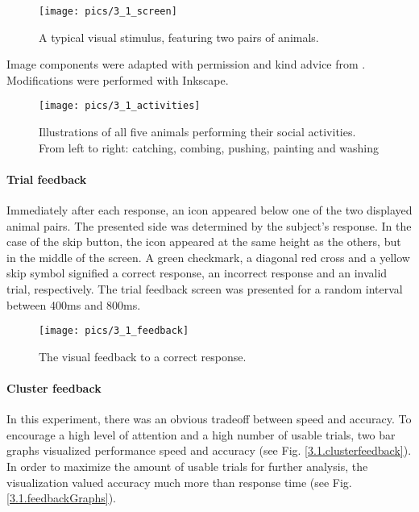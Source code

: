 \begin{figure}[h]
\begin{center}
\vspace{7mm}
\texttt{[image: pics/3\_1\_screen]}
\caption{\label{3.1.screen} A typical visual stimulus, featuring two pairs of animals.}
\end{center}
\end{figure}

Image components were adapted with permission and kind advice from \cite{3.1.animals}.
Modifications were performed with Inkscape.

\begin{figure}[h]
\begin{center}
\vspace{7mm}
\texttt{[image: pics/3\_1\_activities]}
\caption{\label{3.1.activities} Illustrations of all five animals performing their social activities. From left to right: catching, combing, pushing, painting and washing}
\end{center}
\end{figure}

\paragraph{Trial feedback}
Immediately after each response, an icon appeared below one of the two displayed animal pairs.
The presented side was determined by the subject's response.
In the case of the skip button, the icon appeared at the same height as the others, but in the middle of the screen.
A green checkmark, a diagonal red cross and a yellow skip symbol signified a correct response, an incorrect response and an invalid trial, respectively.
The trial feedback screen was presented for a random interval between 400ms and 800ms.

\begin{figure}[h]
\begin{center}
\vspace{7mm}
\texttt{[image: pics/3\_1\_feedback]}
\caption{\label{3.1.feedback} The visual feedback to a correct response.}
\end{center}
\end{figure}

\paragraph{Cluster feedback}
In this experiment, there was an obvious tradeoff between speed and accuracy.
To encourage a high level of attention and a high number of usable trials, two bar graphs visualized performance speed and accuracy (see Fig. \ref{3.1.clusterfeedback}).
In order to maximize the amount of usable trials for further analysis, the visualization valued accuracy much more than response time (see Fig. \ref{3.1.feedbackGraphs}).

